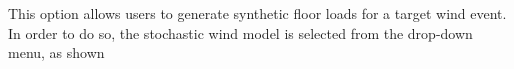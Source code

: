 This option allows users to generate synthetic floor loads for a
target wind event. In order to do so, the stochastic wind
model is selected from the drop-down menu, as shown
